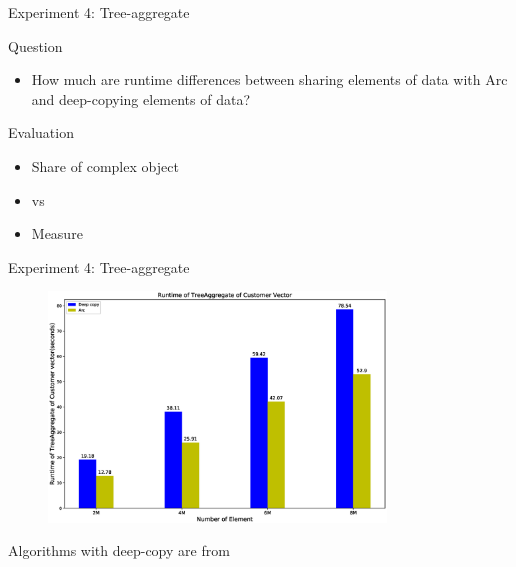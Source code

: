 \documentclass[9pt]{beamer}
\begin{document}

\begin{frame}[fragile]{Experiment 4: Tree-aggregate}
    
    Question
    \begin{itemize}
        \item How much are runtime differences between sharing elements of data with Arc and deep-copying elements of data?
    \end{itemize} 

    Evaluation
    \begin{itemize}
        \item Share  of complex object
        \item {} vs 
        \item Measure 
    \end{itemize}

\end{frame}


\begin{frame}[fragile]{Experiment 4: Tree-aggregate}

    \begin{figure}[hp]
        \centering
        \begin{center}
                \includegraphics[width=0.8\textwidth]{images/rust_tree_aggregate.eps}
                \captionsetup{labelformat=empty}
        \end{center}
    \end{figure}
    \vspace{-.1 cm}
    Algorithms with deep-copy are from  
\end{frame}
\end{document}
